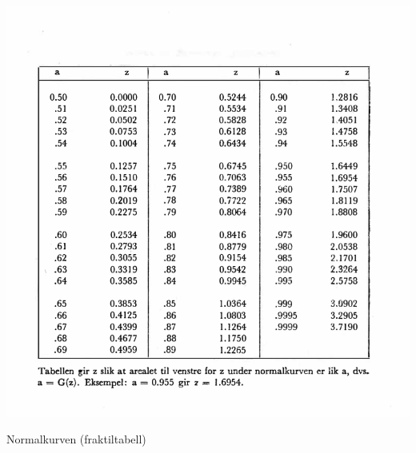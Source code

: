 \begin{table}[H]
\centering
  \includegraphics[scale=1.0]{figurer/Tabell_4b_Normal_Kurvefraktiler.pdf}
 \caption{Normalkurven (fraktiltabell)}
 \label{tab:Normal_Kurvefraktiler} %
\end{table}

